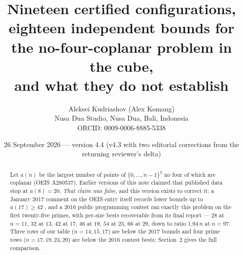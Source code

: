 \documentclass[11pt,a4paper]{article}
\title{Nineteen certified configurations, eighteen independent bounds for the no-four-coplanar problem in the cube,\\
and what they do not establish}
\author{Aleksei Kudriashov (Alex Komang)\\ \small Nusa Dua Studio, Nusa Dua, Bali, Indonesia\\ \small ORCID: 0009-0006-8885-5338}
\date{26 September 2026 --- version 4.4 (v4.3 with two editorial corrections from the returning reviewer's delta)}
\begin{document}
\maketitle
\begin{abstract}
Let $a(n)$ be the largest number of points of $\{0,\dots,n-1\}^3$ no four of which are coplanar
(OEIS A280537).  Earlier versions of this note claimed that published data stop at $a(8)=20$.
\emph{That claim was false}, and this version exists to correct it: a January 2017 comment on
the OEIS entry itself records lower bounds up to $a(17)\ge42$ \cite{OEISA280537}, and a 2016
public programming contest ran exactly this problem on the first twenty-five primes, with
per-size bests recoverable from its final report \cite{AZsPCs} --- $28$ at $n=11$, $32$ at $13$,
$42$ at $17$, $46$ at $19$, $54$ at $23$, $66$ at $29$, down to ratio $1.94\,n$ at $n=97$.
Three rows of our table ($n=14,15,17$) are below the 2017 bounds and four prime rows
($n=17,19,23,29$) are below the 2016 contest bests; Section~2 gives the full comparison.


\end{abstract}
\end{document}
